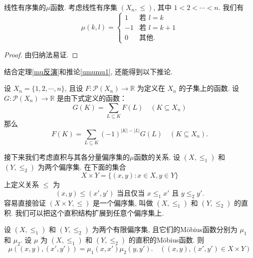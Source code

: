 \begin{corollary}
    线性有序集的\(\mu\)函数. 考虑线性有序集 $(X_n, \leqslant)$, 其中 $1 < 2 < \cdots < n$. 我们有\[\mu(k,l) =
        \begin{cases}
            1  & \text{若 } l = k     \\
            -1 & \text{若 } l = k + 1 \\
            0  & \text{其他.}
        \end{cases}\]
\end{corollary}
\begin{proof}
    由归纳法易证.
\end{proof}

结合定理\ref{mu反演}和推论\ref{umumu1}, 还能得到以下推论.

\begin{corollary}
    设 \( X_n = \{1, 2, \cdots, n\} \), 且设 \( F: \mathcal{P}(X_n) \to \mathbb{R} \) 为定义在 \( X_n \) 的子集上的函数. 设 \( G: \mathcal{P}(X_n) \to \mathbb{R} \) 是由下式定义的函数：
    \[ G(K) = \sum_{L \subseteq K} F(L) \quad (K \subseteq X_n) \]
    那么
    \[ F(K) = \sum_{L \subseteq K} (-1)^{|K| - |L|} G(L) \quad (K \subseteq X_n). \]
\end{corollary}

接下来我们考虑直积与其各分量偏序集的\(\mu\)函数的关系. 设 \((X, \leqslant_1)\) 和 \((Y, \leqslant_2)\) 为两个偏序集. 在下面的集合
\[ X \times Y = \{(x, y) : x \in X, y \in Y\} \]
上定义关系 \(\leqslant\) 为
\[ (x, y) \leqslant (x', y') \text{ 当且仅当 } x \leqslant_1 x' \text{ 且 } y \leqslant_2 y'. \]
容易直接验证 \((X \times Y, \leqslant)\) 是一个偏序集, 叫做 \((X, \leqslant_1)\) 和 \((Y, \leqslant_2)\) 的直积. 我们可以把这个直积结构扩展到任意个偏序集上.

\begin{theorem}[直积的Möbius函数]\label{直积的Möbius函数}
    设 $(X, \leqslant_1)$ 和 $(Y, \leqslant_2)$ 为两个有限偏序集, 且它们的Möbius函数分别为 $\mu_1$ 和 $\mu_2$. 设 $\mu$ 为 $(X, \leqslant_1)$ 和 $(Y, \leqslant_2)$ 的直积的Möbius函数. 则
    \[
        \mu((x,y),(x',y')) = \mu_1(x,x')\mu_2(y,y'). \quad ((x,y),(x',y') \in X \times Y)
    \]
\end{theorem}

